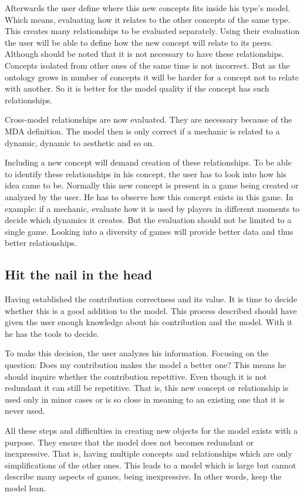 Afterwards the user define where this new concepts fits inside his type's model. Which means, evaluating how it relates to the other concepts of the same type. This creates many relationships to be evaluated separately. Using their evaluation the user will be able to define how the new concept will relate to its peers. Although should be noted that it is not necessary to have these relationships. Concepts isolated from other ones of the same time is not incorrect. But as the ontology grows in number of concepts it will be harder for a concept not to relate with another. So it is better for the model quality if the concept has such relationships.

Cross-model relationships are now evaluated. They are necessary because of the MDA definition. The model then is only correct if a mechanic is related to a dynamic, dynamic to aesthetic and so on.

Including a new concept will demand creation of these relationships. To be able to identify these relationships in his concept, the user has to look into how his idea came to be. Normally this new concept is present in a game being created or analyzed by the user. He has to observe how this concept exists in this game. In example: if a mechanic, evaluate how it is used by players in different moments to decide which dynamics it creates. But the evaluation should not be limited to a single game. Looking into a diversity of games will provide better data and thus better relationships.

\subsection{Hit the nail in the head}

Having established the contribution correctness and its value. It is time to decide whether this is a good addition to the model. This process described should have given the user enough knowledge about his contribution and the model. With it he has the tools to decide.

To make this decision, the user analyzes his information. Focusing on the question: Does my contribution makes the model a better one? This means he should inquire whether the contribution repetitive. Even though it is not redundant it can still be repetitive. That is, this new concept or relationship is used only in minor cases or is so close in meaning to an existing one that it is never used.

All these steps and difficulties in creating new objects for the model exists with a purpose. They ensure that the model does not becomes redundant or inexpressive. That is, having multiple concepts and relationships which are only simplifications of the other ones. This leads to a model which is large but cannot describe many aspects of games, being inexpressive. In other words, keep the model lean. 